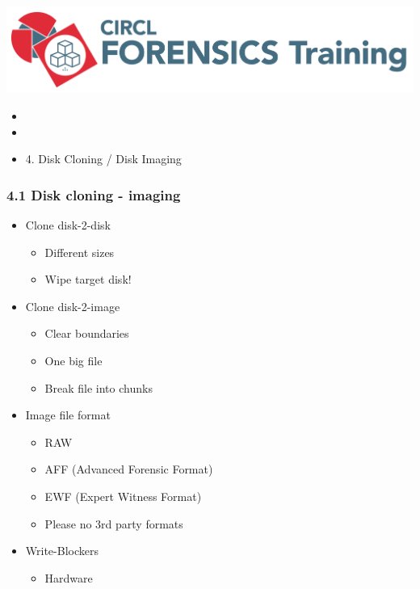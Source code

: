 

\begin{frame}
    \includegraphics[scale=0.3]{images/logo-circl-Forensics.png}
    \begin{itemize}
        \item[]
        \item[]
        \item[] 4. Disk Cloning / Disk Imaging
    \end{itemize}
\end{frame}


\begin{frame}[fragile]
  \frametitle{4.1 Disk cloning - imaging}
    \begin{itemize}
        \item Clone disk-2-disk
        \begin{itemize}
            \item Different sizes
            \item Wipe target disk!
        \end{itemize}
        \item Clone disk-2-image
        \begin{itemize}
            \item Clear boundaries
            \item One big file
            \item Break file into chunks
        \end{itemize}
        \item Image file format
        \begin{itemize}
            \item RAW
            \item AFF (Advanced Forensic Format)
            \item EWF (Expert Witness Format)
            \item Please no 3rd party formats
        \end{itemize}
        \item Write-Blockers
        \begin{itemize}
            \item Hardware
        \end{itemize}
    \end{itemize}
\end{frame}


